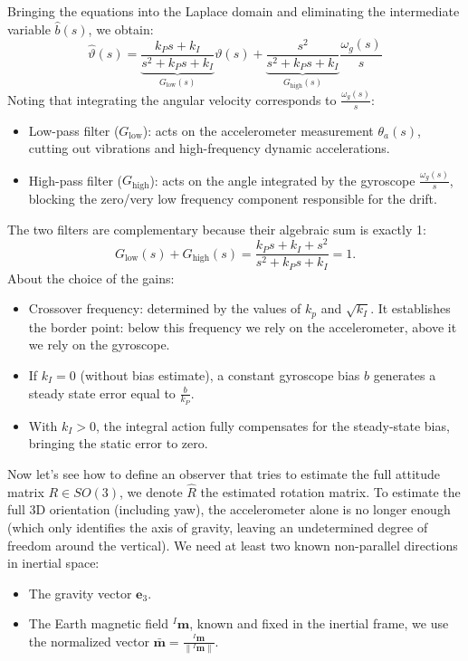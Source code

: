 \documentclass[10pt, a4paper]{report}
\begin{document}
Bringing the equations into the Laplace domain and eliminating the intermediate variable $\hat{b}(s)$, we obtain:\begin{equation}
    \hat{\vartheta}(s) = \underbrace{\frac{k_P s + k_I}{s^2 + k_P s + k_I}}_{G_{\text{low}}(s)} \vartheta(s) + \underbrace{\frac{s^2}{s^2 + k_P s + k_I}}_{G_{\text{high}}(s)} \frac{\omega_g(s)}{s}
\end{equation}
Noting that integrating the angular velocity corresponds to $\frac{\omega_g(s)}{s}$:
\begin{itemize}
\item Low-pass filter ($G_{\text{low}}$): acts on the accelerometer measurement $\theta_a(s)$, cutting out vibrations and high-frequency dynamic accelerations.
\item High-pass filter ($G_{\text{high}}$): acts on the angle integrated by the gyroscope $\frac{\omega_g(s)}{s}$, blocking the zero/very low frequency component responsible for the drift.
\end{itemize}
The two filters are complementary because their algebraic sum is exactly 1:\begin{equation}
    G_{\text{low}}(s) + G_{\text{high}}(s) = \frac{k_P s + k_I + s^2}{s^2 + k_P s + k_I} = 1.
\end{equation}
\noindent About the choice of the gains:\begin{itemize}
    \item Crossover frequency: determined by the values of $k_p$ and $\sqrt{k_I}$. It establishes the border point: below this frequency we rely on the accelerometer, above it we rely on the gyroscope.
    \item If $k_I = 0$ (without bias estimate), a constant gyroscope bias $b$ generates a steady state error equal to $\frac{b}{k_P}$.
    \item With $k_I > 0$, the integral action fully compensates for the steady-state bias, bringing the static error to zero.
\end{itemize}
Now let's see how to define an observer that tries to estimate the full attitude matrix $R\in SO(3)$, we denote $\hat R$ the estimated rotation matrix. To estimate the full 3D orientation (including yaw), the accelerometer alone is no longer enough (which only identifies the axis of gravity, leaving an undetermined degree of freedom around the vertical). We need at least two known non-parallel directions in inertial space:\begin{itemize}
    \item The gravity vector $\mathbf e_3$.
    \item The Earth magnetic field ${}^I\mathbf m$, known and fixed in the inertial frame, we use the normalized vector $\bar{\mathbf m}=\frac{{}^I\mathbf m}{\|{}^I\mathbf m\|}$.
\end{itemize}
\end{document}
